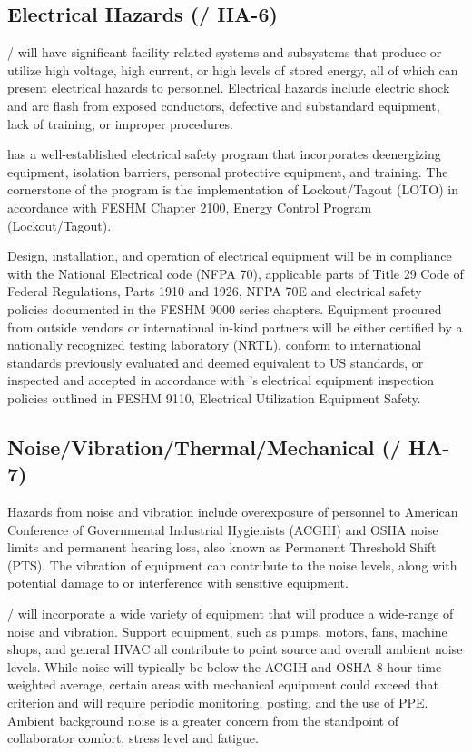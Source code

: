 \subsection{Electrical Hazards (/ HA-6)}

/ will have significant facility-related systems and
subsystems that produce or utilize high voltage, high current, or high
levels of stored energy, all of which can present electrical hazards
to personnel. Electrical hazards include electric shock and arc flash
from exposed conductors, defective and substandard equipment, lack of
training, or improper procedures.

\fnal has a well-established electrical safety program that
incorporates deenergizing equipment, isolation barriers, personal
protective equipment, and training. The cornerstone of the program is
the implementation of Lockout/Tagout (LOTO) in accordance with FESHM
Chapter 2100, \fnal Energy Control Program (Lockout/Tagout).

Design, installation, and operation of electrical equipment will be in
compliance with the National Electrical code (NFPA 70), applicable
parts of Title 29 Code of Federal Regulations, Parts 1910 and 1926,
NFPA 70E and \fnal electrical safety policies documented in the
FESHM 9000 series chapters. Equipment procured from outside vendors or
international in-kind partners will be either certified by a
nationally recognized testing laboratory (NRTL), conform to
international standards previously evaluated and deemed equivalent to
US standards, or inspected and accepted in accordance with \fnal's
electrical equipment inspection policies outlined in FESHM 9110,
Electrical Utilization Equipment Safety.


\subsection{Noise/Vibration/Thermal/Mechanical (/ HA-7)}

Hazards from noise and vibration include overexposure of personnel to
American Conference of Governmental Industrial Hygienists (ACGIH) and
OSHA noise limits and permanent hearing loss, also known as Permanent
Threshold Shift (PTS). The vibration of equipment can contribute to
the noise levels, along with potential damage to or interference with
sensitive equipment.

/ will incorporate a wide variety of equipment that will
produce a wide-range of noise and vibration. Support equipment, such
as pumps, motors, fans, machine shops, and general HVAC all contribute
to point source and overall ambient noise levels. While noise will
typically be below the ACGIH and OSHA 8-hour time weighted average,
certain areas with mechanical equipment could exceed that criterion
and will require periodic monitoring, posting, and the use of
PPE. Ambient background noise is a greater concern from the standpoint
of collaborator comfort, stress level and fatigue.

